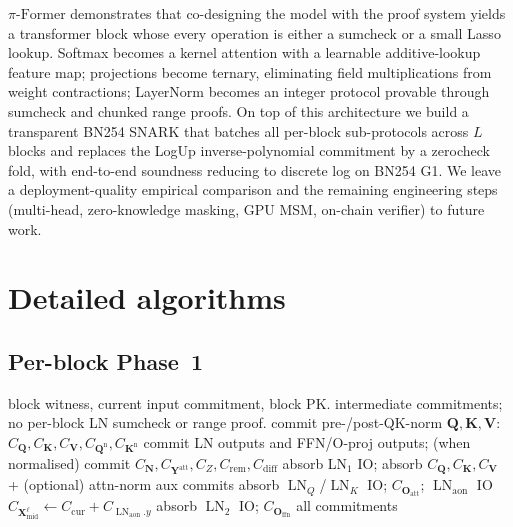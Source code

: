 \documentclass[letterpaper,twocolumn,10pt]{article}
\theoremstyle{remark}
\theoremstyle{definition}
\newcommand{\sys}{\ensuremath{\pi\text{-Former}}}
\newcommand{\bO}{\mathbf{O}}
\newcommand{\bN}{\mathbf{N}}
\newcommand{\bX}{\mathbf{X}}
\newcommand{\bY}{\mathbf{Y}}
\newcommand{\bQ}{\mathbf{Q}}
\newcommand{\bK}{\mathbf{K}}
\newcommand{\bV}{\mathbf{V}}
\DeclareMathOperator{\LN}{LN}
\DeclareMathOperator{\poppk}{\mathsf{pk}}
\begin{document}
\sys{} demonstrates that co-designing the model with the proof system
yields a transformer block whose every operation is either a sumcheck
or a small Lasso lookup. Softmax becomes a kernel attention with a
learnable additive-lookup feature map; projections become ternary,
eliminating field multiplications from weight contractions; LayerNorm
becomes an integer protocol provable through sumcheck and chunked
range proofs. On top of this architecture we build a transparent
BN254 SNARK that batches all per-block sub-protocols across $L$
blocks and replaces the LogUp inverse-polynomial commitment by a
zerocheck fold, with end-to-end soundness reducing to discrete log on
BN254 G1. We leave a deployment-quality empirical comparison and the
remaining engineering steps (multi-head, zero-knowledge masking, GPU
MSM, on-chain verifier) to future work.




\appendix

\section{Detailed algorithms}
\label{app:full-algorithms}

\subsection{Per-block Phase~1}
\label{app:phase1}

\begin{algorithm}[!th]
\caption{$\textsc{Phase1}(W_\ell,C_{\mathrm{cur}},\poppk_\ell,\mathsf{FS})$}
\label{alg:phase1}
\begin{algorithmic}[1]
\Require block witness, current input commitment, block PK.
\Ensure intermediate commitments; no per-block LN sumcheck or range
proof.
\State commit pre-/post-QK-norm $\bQ,\bK,\bV$:\;
       $C_\bQ,C_\bK,C_\bV,C_{\bQ^{\mathrm n}},C_{\bK^{\mathrm n}}$
\State commit LN outputs and FFN/O-proj outputs;\;
       (when normalised) commit $C_\bN,C_{\bY^{\mathrm{att}}},C_Z,C_{\mathrm{rem}},C_{\mathrm{diff}}$
\State absorb LN$_1$ IO; absorb $C_\bQ,C_\bK,C_\bV$ + (optional)
       attn-norm aux commits
\State absorb $\LN_Q$/$\LN_K$ IO; $C_{\bO_{\mathrm{att}}}$;
       $\LN_{\mathrm{aon}}$ IO
\State $C_{\bX_{\mathrm{mid}}^\ell}\!\gets\!C_{\mathrm{cur}}+C_{\LN_{\mathrm{aon}}.y}$
\State absorb $\LN_2$ IO; $C_{\bO_{\mathrm{ffn}}}$
\State \Return all commitments
\end{algorithmic}
\end{algorithm}
\end{document}
